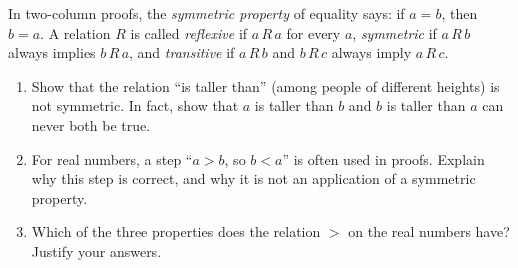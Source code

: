 In two-column proofs, the \emph{symmetric property} of equality says: if $a=b$, then $b=a$. A relation $R$ is called \emph{reflexive} if $a\,R\,a$ for every $a$, \emph{symmetric} if $a\,R\,b$ always implies $b\,R\,a$, and \emph{transitive} if $a\,R\,b$ and $b\,R\,c$ always imply $a\,R\,c$.
\begin{enumerate}
\item[(a)] Show that the relation ``is taller than'' (among people of different heights) is not symmetric. In fact, show that $a$ is taller than $b$ and $b$ is taller than $a$ can never both be true.
\item[(b)] For real numbers, a step ``$a>b$, so $b<a$'' is often used in proofs. Explain why this step is correct, and why it is not an application of a symmetric property.
\item[(c)] Which of the three properties does the relation $>$ on the real numbers have? Justify your answers.
\end{enumerate}
